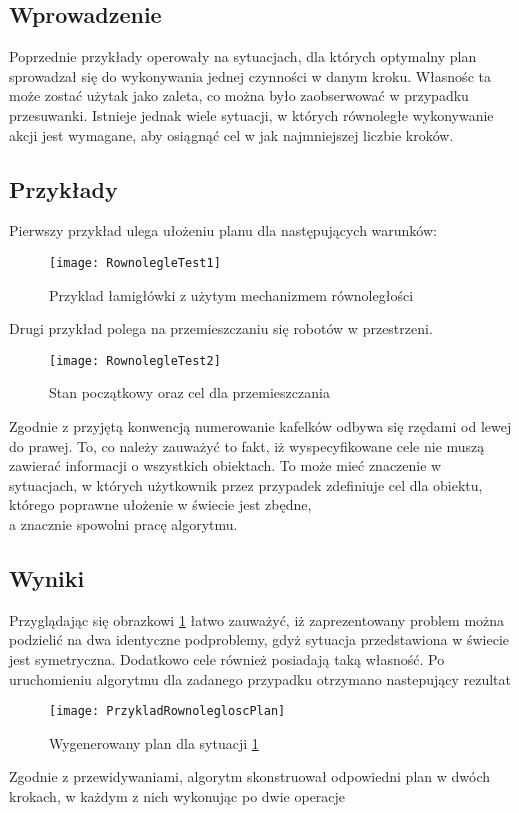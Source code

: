     \subsection{Wprowadzenie}
    Poprzednie przykłady operowały na sytuacjach, dla których optymalny plan sprowadzał się do wykonywania jednej czynności w danym kroku. Własnośc ta
    może zostać użytak jako zaleta, co można było zaobserwować w przypadku przesuwanki. 
    Istnieje jednak wiele sytuacji, w których równoległe wykonywanie akcji jest wymagane, aby 
    osiągnąć cel w jak najmniejszej liczbie kroków.
    \subsection{Przykłady}
    Pierwszy przykład ulega ułożeniu planu dla następujących warunków:
    \begin{figure}[H]
        \texttt{[image: RownolegleTest1]}
        \centering
        \caption{Przyklad łamigłówki z użytym mechanizmem równoległości}
        \label{Conc}
    \end{figure}
    Drugi przykład polega na przemieszczaniu się robotów w przestrzeni.
    \begin{figure}[H]
        \texttt{[image: RownolegleTest2]}
        \centering
        \caption{Stan początkowy oraz cel dla przemieszczania}
        \label{Swaps}
    \end{figure}
    Zgodnie z przyjętą konwencją numerowanie kafelków odbywa się rzędami od lewej do prawej. To, co należy zauważyć to fakt, iż wyspecyfikowane cele 
    nie muszą zawierać informacji o wszystkich obiektach. To może mieć znaczenie w sytuacjach, w których użytkownik przez przypadek zdefiniuje 
    cel dla obiektu, którego poprawne ułożenie w świecie jest zbędne, \\
    a znacznie spowolni pracę algorytmu.
    \subsection{Wyniki}
    Przyglądając się obrazkowi \ref{Conc} łatwo zauważyć, iż zaprezentowany problem można podzielić na dwa identyczne podproblemy, gdyż sytuacja przedstawiona 
    w świecie jest symetryczna. Dodatkowo cele również posiadają taką własność. Po uruchomieniu algorytmu dla zadanego przypadku otrzymano
    nastepujący rezultat
    \begin{figure}[H]
        \texttt{[image: PrzykladRownolegloscPlan]}
        \centering
        \caption{Wygenerowany plan dla sytuacji \ref{Conc}}
    \end{figure}
    Zgodnie z przewidywaniami, algorytm skonstruował odpowiedni plan w dwóch krokach, w każdym z nich wykonując po dwie operacje
    
